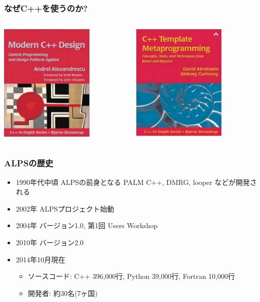 \begin{frame}
  \frametitle{なぜC++を使うのか?}
  \begin{columns}[T]
    \begin{column}{.5\textwidth}
      \centering \includegraphics[width=4.5cm]{modern-cxx.pdf}
    \end{column}
    \begin{column}{.5\textwidth}
      \centering \includegraphics[width=4.5cm]{cxx-template.pdf}
    \end{column}
  \end{columns}
\end{frame}

\begin{frame}
  \frametitle{ALPSの歴史}
  \begin{itemize}
  \item 1990年代中頃 ALPSの前身となる PALM C++, DMRG, looper などが開発される
  \item 2002年 ALPSプロジェクト始動
  \item 2004年 バージョン1.0, 第1回 Users Workshop
  \item 2010年 バージョン2.0
  \item 2014年10月現在
    \begin{itemize}
      \item ソースコード: C++ 396,000行, Python 39,000行, Fortran 10,000行
      \item 開発者: 約30名(7ヶ国)
    \end{itemize}
  \end{itemize}
\end{frame}

